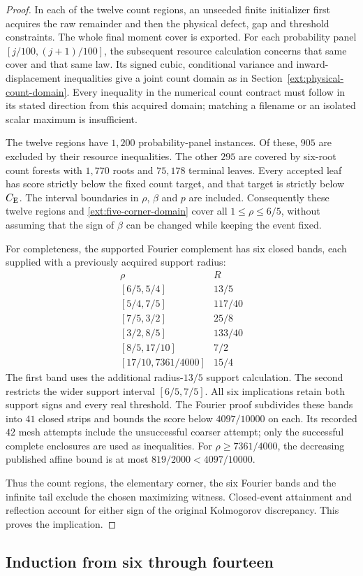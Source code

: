 \begin{proof}
In each of the twelve count regions, an unseeded finite initializer
first acquires the raw remainder and then the physical defect, gap
and threshold constraints. The whole final moment cover is exported.
For each probability panel $[j/100,(j+1)/100]$, the subsequent resource
calculation concerns that same cover and that same law. Its signed
cubic, conditional variance and inward-displacement inequalities give
a joint count domain as in Section~\ref{ext:physical-count-domain}.
Every inequality in the numerical count contract must follow in its
stated direction from this acquired domain; matching a filename or
an isolated scalar maximum is insufficient.

The twelve regions have $1,200$ probability-panel instances. Of
these, $905$ are excluded by their resource inequalities. The other
$295$ are covered by six-root count forests with $1,770$ roots and
$75,178$ terminal leaves. Every accepted leaf has score strictly below
the fixed count target, and that target is strictly below $C_{\mathrm E}$.
The interval boundaries in $\rho$, $\beta$ and $p$ are included.
Consequently these twelve regions and \eqref{ext:five-corner-domain}
cover all $1\le\rho\le6/5$, without assuming that the sign of
$\beta$ can be changed while keeping the event fixed.

For completeness, the supported Fourier complement has six closed
bands, each supplied with a previously acquired support radius:
\[
\begin{array}{c|c}
\rho& R\\\hline
{[6/5,5/4]}&13/5\\
{[5/4,7/5]}&117/40\\
{[7/5,3/2]}&25/8\\
{[3/2,8/5]}&133/40\\
{[8/5,17/10]}&7/2\\
{[17/10,7361/4000]}&15/4
\end{array}
\]
The first band uses the additional radius-$13/5$ support calculation.
The second restricts the wider support interval $[6/5,7/5]$.
All six implications retain both support signs and every real
threshold. The Fourier proof subdivides these bands into $41$ closed
strips and bounds the score below $4097/10000$ on each. Its recorded
$42$ mesh attempts include the unsuccessful coarser attempt; only
the successful complete enclosures are used as inequalities.
For $\rho\ge7361/4000$, the decreasing published affine bound is
at most $819/2000<4097/10000$.

Thus the count regions, the elementary corner, the six Fourier
bands and the infinite tail exclude the chosen maximizing witness.
Closed-event attainment and reflection account for either sign of
the original Kolmogorov discrepancy. This proves the implication.
\end{proof}

\subsection{Induction from six through fourteen}
